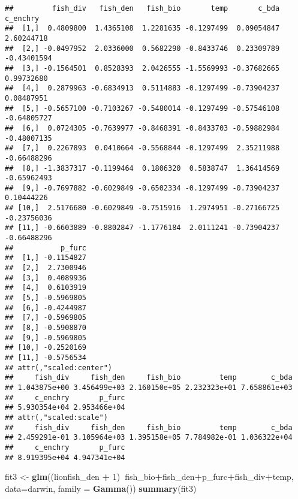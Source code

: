\documentclass[]{article}
\newenvironment{Shaded}{\begin{snugshade}}{\end{snugshade}}
\newcommand{\KeywordTok}[1]{\textcolor[rgb]{0.13,0.29,0.53}{\textbf{#1}}}
\newcommand{\DataTypeTok}[1]{\textcolor[rgb]{0.13,0.29,0.53}{#1}}
\newcommand{\DecValTok}[1]{\textcolor[rgb]{0.00,0.00,0.81}{#1}}
\newcommand{\StringTok}[1]{\textcolor[rgb]{0.31,0.60,0.02}{#1}}
\newcommand{\OperatorTok}[1]{\textcolor[rgb]{0.81,0.36,0.00}{\textbf{#1}}}
\newcommand{\NormalTok}[1]{#1}
\begin{document}
\begin{verbatim}
##         fish_div   fish_den   fish_bio       temp       c_bda    c_enchry
##  [1,]  0.4809800  1.4365108  1.2281635 -0.1297499  0.09054847  2.60244718
##  [2,] -0.0497952  2.0336000  0.5682290 -0.8433746  0.23309789 -0.43401594
##  [3,] -0.1564501  0.8528393  2.0426555 -1.5569993 -0.37682665  0.99732680
##  [4,]  0.2879963 -0.6834913  0.5114883 -0.1297499 -0.73904237  0.08487951
##  [5,] -0.5657100 -0.7103267 -0.5480014 -0.1297499 -0.57546108 -0.64805727
##  [6,]  0.0724305 -0.7639977 -0.8468391 -0.8433703 -0.59882984 -0.48007135
##  [7,]  0.2267893  0.0410664 -0.5568844 -0.1297499  2.35211988 -0.66488296
##  [8,] -1.3837317 -0.1199464  0.1806320  0.5838747  1.36414569 -0.65962493
##  [9,] -0.7697882 -0.6029849 -0.6502334 -0.1297499 -0.73904237  0.10444226
## [10,]  2.5176680 -0.6029849 -0.7515916  1.2974951 -0.27166725 -0.23756036
## [11,] -0.6603889 -0.8802847 -1.1776184  2.0111241 -0.73904237 -0.66488296
##           p_furc
##  [1,] -0.1154827
##  [2,]  2.7300946
##  [3,]  0.4089936
##  [4,]  0.6103919
##  [5,] -0.5969805
##  [6,] -0.4244987
##  [7,] -0.5969805
##  [8,] -0.5908870
##  [9,] -0.5969805
## [10,] -0.2520169
## [11,] -0.5756534
## attr(,"scaled:center")
##     fish_div     fish_den     fish_bio         temp        c_bda 
## 1.043875e+00 3.456499e+03 2.160150e+05 2.232323e+01 7.658861e+03 
##     c_enchry       p_furc 
## 5.930354e+04 2.953466e+04 
## attr(,"scaled:scale")
##     fish_div     fish_den     fish_bio         temp        c_bda 
## 2.459291e-01 3.105964e+03 1.395158e+05 7.784982e-01 1.036322e+04 
##     c_enchry       p_furc 
## 8.919395e+04 4.947341e+04
\end{verbatim}

\begin{Shaded}
\begin{Highlighting}[]
\NormalTok{fit3 <-}\StringTok{ }\KeywordTok{glm}\NormalTok{((lionfish_den }\OperatorTok{+}\StringTok{ }\DecValTok{1}\NormalTok{)}\OperatorTok{~}\NormalTok{fish_bio}\OperatorTok{+}\NormalTok{fish_den}\OperatorTok{+}\NormalTok{p_furc}\OperatorTok{+}\NormalTok{fish_div}\OperatorTok{+}\NormalTok{temp, }\DataTypeTok{data=}\NormalTok{darwin, }\DataTypeTok{family =} \KeywordTok{Gamma}\NormalTok{())}
\KeywordTok{summary}\NormalTok{(fit3)}
\end{Highlighting}
\end{Shaded}
\end{document}
